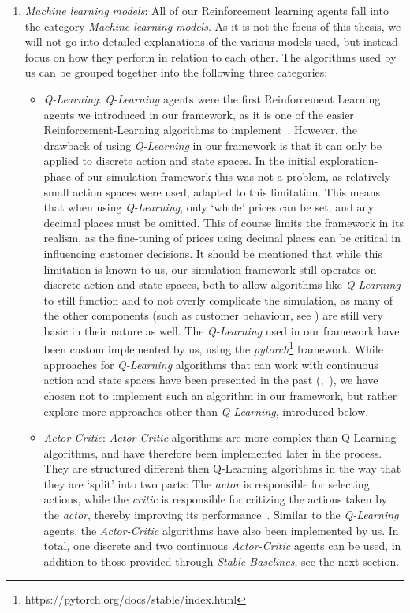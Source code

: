 \begin{enumerate}
	\item \emph{Machine learning models}: All of our Reinforcement learning agents fall into the category \emph{Machine learning models}. As it is not the focus of this thesis, we will not go into detailed explanations of the various models used, but instead focus on how they perform in relation to each other. The algorithms used by us can be grouped together into the following three categories:
	      \begin{itemize}
		      \item \emph{Q-Learning}: \emph{Q-Learning} agents were the first Reinforcement Learning agents we introduced in our framework, as it is one of the easier Reinforcement-Learning algorithms to implement~\cite{reinforcementLearningOverview}. However, the drawback of using \emph{Q-Learning} in our framework is that it can only be applied to discrete action and state spaces. In the initial exploration-phase of our simulation framework this was not a problem, as relatively small action spaces were used, adapted to this limitation. This means that when using \emph{Q-Learning}, only `whole' prices can be set, and any decimal places must be omitted. This of course limits the framework in its realism, as the fine-tuning of prices using decimal places can be critical in influencing customer decisions. It should be mentioned that while this limitation is known to us, our simulation framework still operates on discrete action and state spaces, both to allow algorithms like \emph{Q-Learning} to still function and to not overly complicate the simulation, as many of the other components (such as customer behaviour, see ) are still very basic in their nature as well. The \emph{Q-Learning} used in our framework have been custom implemented by us, using the \emph{pytorch}\footnote[0][-0.2]{https://pytorch.org/docs/stable/index.html} framework. While approaches for \emph{Q-Learning} algorithms that can work with continuous action and state spaces have been presented in the past (\cite{QLearningContinuous},~\cite{QLearningContinuous2}), we have chosen not to implement such an algorithm in our framework, but rather explore more approaches other than \emph{Q-Learning}, introduced below.
		      \item \emph{Actor-Critic}: \emph{Actor-Critic} algorithms are more complex than Q-Learning algorithms, and have therefore been implemented later in the process. They are structured different then Q-Learning algorithms in the way that they are `split' into two parts: The \emph{actor} is responsible for selecting actions, while the \emph{critic} is responsible for critizing the actions taken by the \emph{actor}, thereby improving its performance~\cite{ActorCritic}. Similar to the \emph{Q-Learning} agents, the \emph{Actor-Critic} algorithms have also been implemented by us. In total, one discrete and two continuous \emph{Actor-Critic} agents can be used, in addition to those provided through \emph{Stable-Baselines}, see the next section.

\end{itemize}
\end{enumerate}
